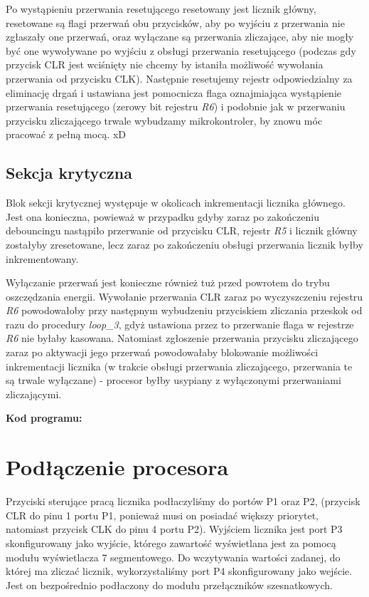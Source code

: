 \documentclass[fleqn]{article}
\begin{document}
		Po wystąpieniu przerwania resetującego resetowany jest licznik główny, resetowane są flagi przerwań obu przycisków, aby po wyjściu z przerwania nie zgłaszały one przerwań, oraz wyłączane są przerwania zliczające, aby nie mogły być one wywoływane po wyjściu z obsługi przerwania resetującego (podczas gdy przycisk CLR jest wciśnięty nie chcemy by istaniła możliwość wywołania przerwania od przycisku CLK). Następnie resetujemy rejestr odpowiedzialny za eliminację drgań i ustawiana jest pomocnicza flaga oznajmiająca wystąpienie przerwania resetującego (zerowy bit rejestru \textit{R6}) i podobnie jak w przerwaniu przycisku zliczającego trwale wybudzamy mikrokontroler, by znowu móc pracować z pełną mocą. xD

\subsection{Sekcja krytyczna}
		Blok sekcji krytycznej występuje w okolicach inkrementacji licznika głównego. Jest ona konieczna, powieważ w przypadku gdyby zaraz po zakończeniu debouncingu nastąpiło przerwanie od przycisku CLR, rejestr \textit{R5} i licznik główny zostałyby zresetowane, lecz zaraz po zakończeniu obsługi przerwania licznik byłby inkrementowany.

		Wyłączanie przerwań jest konieczne również tuż przed powrotem do trybu oszczędzania energii. Wywołanie przerwania CLR zaraz po wyczyszczeniu rejestru \textit{R6} powodowałoby przy następnym wybudzeniu przyciskiem zliczania przeskok od razu do procedury \textit{loop\_3}, gdyż ustawiona przez to przerwanie flaga w rejestrze \textit{R6} nie byłaby kasowana. Natomiast zgłoszenie przerwania przycisku zliczającego zaraz po aktywacji jego przerwań powodowałaby blokowanie możliwości inkrementacji licznika (w trakcie obsługi przerwania zliczającego, przerwania te są trwale wyłączane) - procesor byłby usypiany z wyłączonymi przerwaniami zliczającymi.


\textbf{Kod programu:}







\section{Podłączenie procesora}

Przyciski sterujące pracą licznika podłaczyliśmy do portów P1 oraz P2, (przycisk CLR do pinu 1 portu P1, ponieważ musi on posiadać większy priorytet, natomiast przycisk CLK do pinu 4 portu P2). Wyjściem licznika jest port P3 skonfigurowany jako wyjście, którego zawartość wyświetlana jest za pomocą modułu wyświetlacza 7 segmentowego. Do wczytywania wartości zadanej, do której ma zliczać licznik, wykorzystaliśmy port P4 skonfigurowany jako wejście. Jest on bezpośrednio podłaczony do modułu przełączników szesnatkowych.
\end{document}
